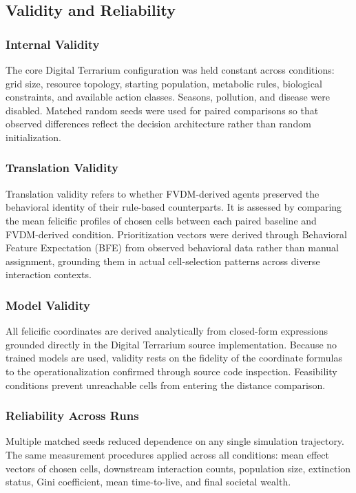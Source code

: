 \documentclass{icsthesis}
\begin{document}
\begin{mainmatter}
\subsection{Validity and Reliability}

\subsubsection{Internal Validity}
The core Digital Terrarium configuration was held constant across conditions: grid size, resource topology, starting population, metabolic rules, biological constraints, and available action classes. Seasons, pollution, and disease were disabled. Matched random seeds were used for paired comparisons so that observed differences reflect the decision architecture rather than random initialization.

\subsubsection{Translation Validity}
Translation validity refers to whether FVDM-derived agents preserved the behavioral identity of their rule-based counterparts. It is assessed by comparing the mean felicific profiles of chosen cells between each paired baseline and FVDM-derived condition. Prioritization vectors were derived through Behavioral Feature Expectation (BFE) from observed behavioral data rather than manual assignment, grounding them in actual cell-selection patterns across diverse interaction contexts.

\subsubsection{Model Validity}
All felicific coordinates are derived analytically from closed-form expressions grounded directly in the Digital Terrarium source implementation. Because no trained models are used, validity rests on the fidelity of the coordinate formulas to the operationalization confirmed through source code inspection. Feasibility conditions prevent unreachable cells from entering the distance comparison.

\subsubsection{Reliability Across Runs}
Multiple matched seeds reduced dependence on any single simulation trajectory. The same measurement procedures applied across all conditions: mean effect vectors of chosen cells, downstream interaction counts, population size, extinction status, Gini coefficient, mean time-to-live, and final societal wealth.


\end{mainmatter}
\end{document}
